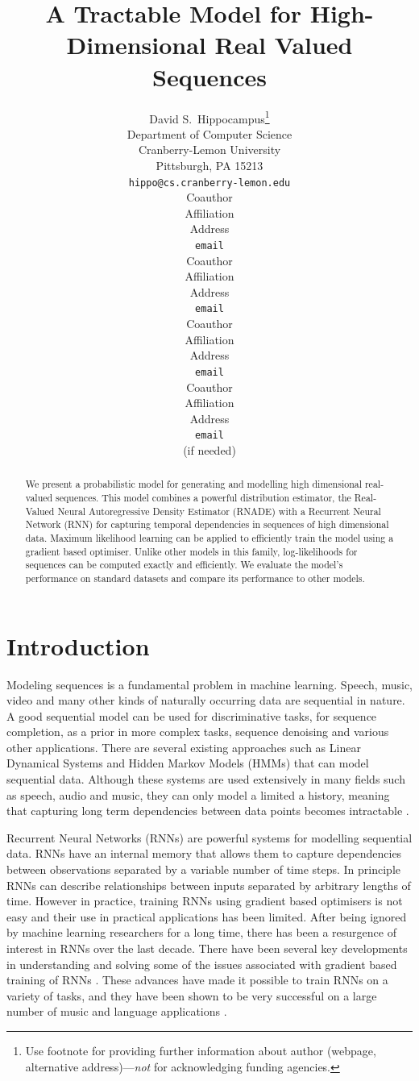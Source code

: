 \documentclass{article} %
\title{A Tractable Model for High-Dimensional Real Valued Sequences}
\author{
David S.~Hippocampus\thanks{ Use footnote for providing further information
about author (webpage, alternative address)---\emph{not} for acknowledging
funding agencies.} \\
Department of Computer Science\\
Cranberry-Lemon University\\
Pittsburgh, PA 15213 \\
\texttt{hippo@cs.cranberry-lemon.edu} \\
\And
Coauthor \\
Affiliation \\
Address \\
\texttt{email} \\
\AND
Coauthor \\
Affiliation \\
Address \\
\texttt{email} \\
\And
Coauthor \\
Affiliation \\
Address \\
\texttt{email} \\
\And
Coauthor \\
Affiliation \\
Address \\
\texttt{email} \\
(if needed)\\
}
\begin{document}
\maketitle

\begin{abstract}
We present a probabilistic model for generating and modelling high dimensional real-valued sequences. This model combines a powerful distribution estimator, the Real-Valued Neural Autoregressive Density Estimator (RNADE) with a Recurrent Neural Network (RNN) for capturing temporal dependencies in sequences of high dimensional data. Maximum likelihood learning can be applied to efficiently train the model using a gradient based optimiser. Unlike other models in this family, log-likelihoods for sequences can be computed exactly and efficiently. We evaluate the model's performance on standard datasets and compare its performance to other models. 
\end{abstract}

\section{Introduction}
\label{intro}
Modeling sequences is a fundamental problem in machine learning. Speech, music, video and many other kinds of naturally occurring data are sequential in nature. A good sequential model can be used for discriminative tasks, for sequence completion, as a prior in more complex tasks, sequence denoising and various other applications. There are several existing approaches such as Linear Dynamical Systems and Hidden Markov Models (HMMs) that can model sequential data. Although these systems are used extensively in many fields such as speech, audio and music, they can only model a limited a history, meaning that capturing long term dependencies between data points becomes intractable \cite{sutskever2007learning}. 

Recurrent Neural Networks (RNNs) are powerful systems for modelling sequential data. RNNs have an internal memory that allows them to capture dependencies between observations separated by a variable number of time steps. In principle RNNs can describe relationships between inputs separated by arbitrary lengths of time. However in practice, training RNNs using gradient based optimisers is not easy and their use in practical applications has been limited. After being ignored by machine learning researchers for a long time, there has been a resurgence of interest in RNNs over the last decade. There have been several key developments in understanding and solving some of the issues associated with gradient based training of RNNs \cite{Martens2011,bengio2012advances}. These advances have made it possible to train RNNs on a variety of tasks, and they have been shown to be very successful on a large number of music and language applications \cite{mikolov2011empirical,Boulanger-Lewandowski2012,bengio2012advances}. 
\end{document}
